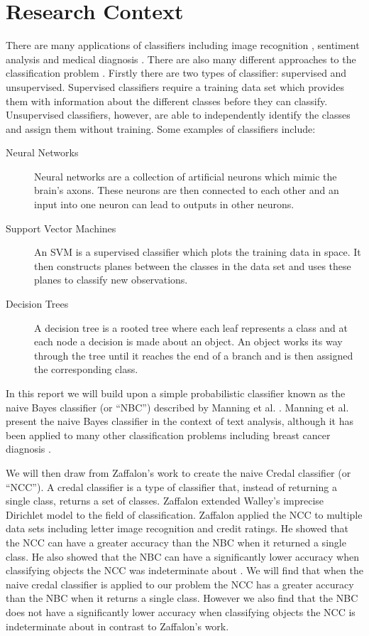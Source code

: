 \section{Research Context}
There are many applications of classifiers including image recognition \cite{Chapelle99}, sentiment analysis \cite{Melville09} and medical diagnosis \cite{Ster96}.
There are also many different approaches to the classification problem \cite{Michie94}.
Firstly there are two types of classifier: supervised and unsupervised.
Supervised classifiers require a training data set which provides them with information about the different classes before they can classify. Unsupervised classifiers, however, are able to independently identify the classes and assign them without training.
Some examples of classifiers include:
\begin{description}
	\item[Neural Networks] Neural networks are a collection of artificial neurons which mimic the brain's axons. These neurons are then connected to each other and an input into one neuron can lead to outputs in other neurons.
	\item[Support Vector Machines] An SVM is a supervised classifier which plots the training data in space. It then constructs planes between the classes in the data set and uses these planes to classify new observations.
	\item[Decision Trees] A decision tree is a rooted tree where each leaf represents a class and at each node a decision is made about an object. An object works its way through the tree until it reaches the end of a branch and is then assigned the corresponding class. 
\end{description}

In this report we will build upon a simple probabilistic classifier known as the naive Bayes classifier (or ``NBC'') described by Manning et al. \cite{Manning08}.
Manning et al. present the naive Bayes classifier in the context of text analysis, although it has been applied to many other classification problems including breast cancer diagnosis \cite{Dumitru09}.

We will then draw from Zaffalon's work \cite{Zaffalon01} to create the naive Credal classifier (or ``NCC'').
A credal classifier is a type of classifier that, instead of returning a single class, returns a set of classes.
Zaffalon extended Walley's imprecise Dirichlet model \cite{Walley96} to the field of classification.
Zaffalon applied the NCC to multiple data sets including letter image recognition and credit ratings.
He showed that the NCC can have a greater accuracy than the NBC when it returned a single class.
He also showed that the NBC can have a significantly lower accuracy when classifying objects the NCC was indeterminate about \cite{Zaffalon01}.
We will find that when the naive credal classifier is applied to our problem the NCC has a greater accuracy than the NBC when it returns a single class.
However we also find that the NBC does not have a significantly lower accuracy when classifying objects the NCC is indeterminate about in contrast to Zaffalon's work.

